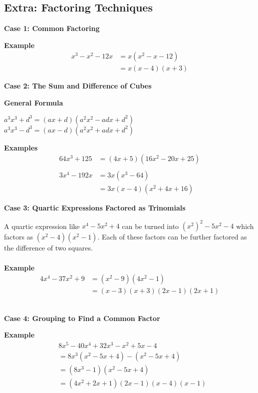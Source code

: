 \documentclass[12pt]{article}
\begin{document}
\subsection*{Extra: Factoring Techniques}
\textbf{Case 1: Common Factoring}
	\begin{tcolorbox}
	\textbf{Example}
		\begin{align*}
			x^3-x^2-12x&=x(x^2-x-12) \\
			&=x(x-4)(x+3)
		\end{align*}
	\end{tcolorbox}
\textbf{Case 2: The Sum and Difference of Cubes}
	\begin{tcolorbox}
		\textbf{General Formula}
		\begin{center}
			$a^3x^3+d^3=(ax+d)(a^2x^2-adx+d^2)$
			$a^3x^3-d^3=(ax-d)(a^2x^2+adx+d^2)$
		\end{center}
		\textbf{Examples}
		\begin{align*}
			64x^3+125&=(4x+5)(16x^2-20x+25) \\
			\\
			3x^4 - 192x&=3x(x^3-64) \\
			&=3x(x-4)(x^2+4x+16)
		\end{align*}
	\end{tcolorbox}
\textbf{Case 3: Quartic Expressions Factored as Trinomials}
	\begin{tcolorbox}
		A quartic expression like $x^4-5x^2+4$ can be turned into $(x^2)^2-5x^2-4$ which factors as $(x^2-4)(x^2-1)$. Each of these factors can be further factored as the difference of two squares. \\
		\\
		\textbf{Example}
		\begin{align*}
			4x^4-37x^2+9&=(x^2-9)(4x^2-1) \\
			&=(x-3)(x+3)(2x-1)(2x+1)
		\end{align*}
	\end{tcolorbox}
\\
\textbf{Case 4: Grouping to Find a Common Factor}
\begin{tcolorbox}
	\textbf{Example}
	\begin{align*}
		&8x^5-40x^4+32x^3-x^2+5x-4 \\
		&=8x^3(x^2-5x+4)-(x^2-5x+4) \\
		&=(8x^3-1)(x^2-5x+4) \\
		&=(4x^2+2x+1)(2x-1)(x-4)(x-1)
	\end{align*}
\end{tcolorbox}
\end{document}
